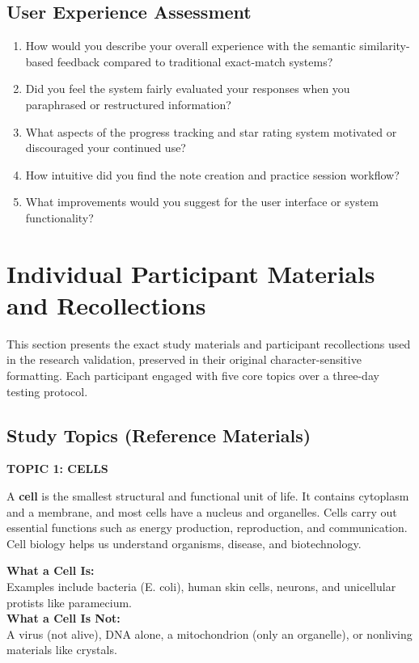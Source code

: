 {\subsection{User Experience Assessment}
\begin{enumerate}
    \item How would you describe your overall experience with the semantic similarity-based feedback compared to traditional exact-match systems?
    \item Did you feel the system fairly evaluated your responses when you paraphrased or restructured information?
    \item What aspects of the progress tracking and star rating system motivated or discouraged your continued use?
    \item How intuitive did you find the note creation and practice session workflow?
    \item What improvements would you suggest for the user interface or system functionality?
\end{enumerate}



\section{Individual Participant Materials and Recollections}

This section presents the exact study materials and participant recollections used in the research validation, preserved in their original character-sensitive formatting. Each participant engaged with five core topics over a three-day testing protocol.

\subsection{Study Topics (Reference Materials)}

{\small
\textbf{TOPIC 1: CELLS}

A \textbf{cell} is the smallest structural and functional unit of life. It contains cytoplasm and a membrane, and most cells have a nucleus and organelles. Cells carry out essential functions such as energy production, reproduction, and communication. Cell biology helps us understand organisms, disease, and biotechnology.

\textbf{What a Cell Is:}\\
Examples include bacteria (E. coli), human skin cells, neurons, and unicellular protists like paramecium.\\
\textbf{What a Cell Is Not:}\\
A virus (not alive), DNA alone, a mitochondrion (only an organelle), or nonliving materials like crystals.

}}
